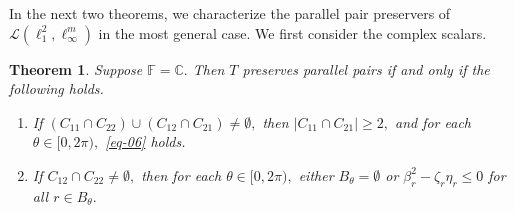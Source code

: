 \documentclass{amsart}
\newtheorem{theorem}{Theorem}[section]
\theoremstyle{definition}
\theoremstyle{remark}
\numberwithin{equation}{section}
\begin{document}
In the next two theorems, we characterize the parallel pair preservers of $\mathcal{L}(\ell_1^2,\ell_\infty^m)$ in the most general case. We first consider the complex scalars.
\begin{theorem}\label{th-com}
Suppose $\mathbb{F}=\mathbb{C}.$ Then $T$ preserves parallel pairs if and only if the following holds.
	\begin{enumerate}
		\item If $(C_{11}\cap C_{22})\cup (C_{12}\cap C_{21})\neq \emptyset,$  then $|C_{11}\cap C_{21}|\geq 2,$ and  for each $\theta\in [0,2\pi), $ \eqref{eq-06} holds.
		\item If $C_{12}\cap C_{22}\neq \emptyset,$  then for each $\theta\in [0,2\pi),$ either $B_\theta=\emptyset$ or   $\beta_{r}^2-\zeta_r\eta_r\leq0$ for all $r\in B_{\theta}.$
	\end{enumerate}
\end{theorem}
\end{document}
